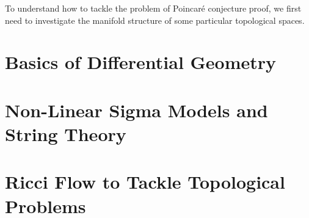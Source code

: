 To understand how to tackle the problem of Poincaré conjecture proof, we first need to investigate the manifold structure of some particular topological spaces.

\section{Basics of Differential Geometry}

\section{Non-Linear Sigma Models and String Theory}



\section{Ricci Flow to Tackle Topological Problems}

